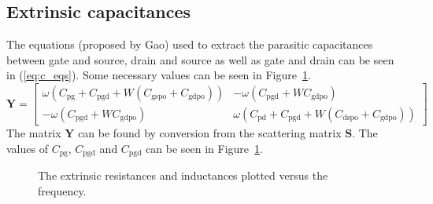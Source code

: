 \documentclass[12pt,a4paper]{article}
\begin{document}
\subsection{Extrinsic capacitances}\label{sec:1b}
The equations (proposed by Gao) used to extract the parasitic capacitances between gate and source, drain and source as well as gate and drain can be seen in (\ref{eq:c_eqs}). Some necessary values can be seen in Figure~\ref{fig:c_fig}.
\begin{equation}
  \label{eq:c_eqs}
  \mathbf{Y}=
  \begin{bmatrix}
    \omega(C_{\text{pg}}+C_{\text{pgd}}+W(C_{\text{gspo}}+C_{\text{gdpo}})) & -\omega(C_{\text{pgd}}+WC_{\text{gdpo}}) \\
    -\omega(C_{\text{pgd}}+WC_{\text{gdpo}}) & \omega(C_{\text{pd}}+C_{\text{pgd}}+W(C_{\text{dspo}}+C_{\text{gdpo}}))
  \end{bmatrix}
\end{equation}
The matrix $\mathbf{Y}$ can be found by conversion from the scattering matrix $\mathbf{S}$. The values of $C_{\text{pg}}$, $C_{\text{pgd}}$ and $C_{\text{pgd}}$ can be seen in Figure~\ref{fig:c_fig}.
\begin{figure}
  \centering
  \noindent{}
  \caption{The extrinsic resistances and inductances plotted versus the frequency.}
  \label{fig:c_fig}
\end{figure}
\end{document}
